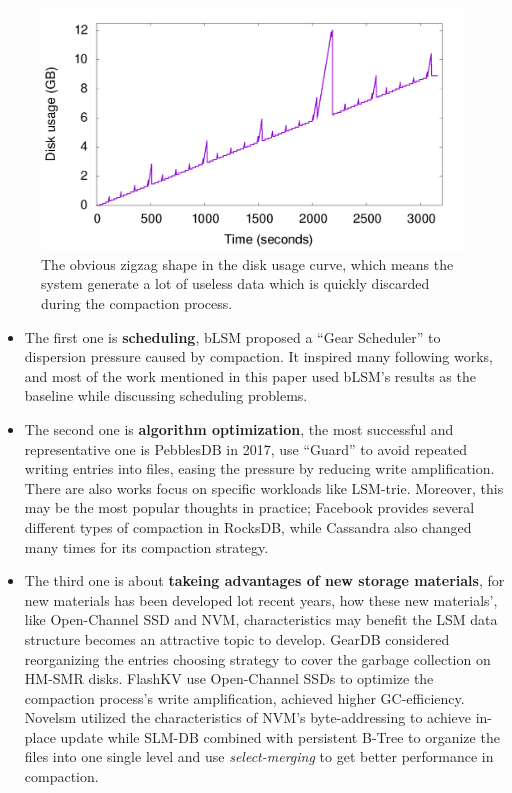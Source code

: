 \begin{figure}
	\centering
	\includegraphics[width=0.9\columnwidth]{fig/compaction-2}
	\caption{The obvious zigzag shape in the disk usage curve, which means the system generate a lot of useless data which is quickly discarded during the compaction process.}
	\label{fig:disk_usage}
\end{figure}

\begin{itemize}
	\item The first one is \textbf{scheduling},  bLSM\cite{sears2012blsm} proposed a ``Gear Scheduler'' to dispersion pressure caused by compaction. It inspired many following works, and most of the work mentioned in this paper used bLSM's results as the baseline while discussing scheduling problems. 
	\item     The second one is \textbf{algorithm optimization}, the most successful and representative one is PebblesDB in 2017\cite{raju2017pebblesdb}, use ``Guard'' to avoid repeated writing entries into files, easing the pressure by reducing write amplification. There are also works focus on specific workloads like LSM-trie\cite{wu2015lsm}. Moreover, this may be the most popular thoughts in practice; Facebook provides several different types of compaction in RocksDB\cite{Compacti60:online},\cite{dong2017optimizing} while Cassandra also changed many times for its compaction strategy\cite{Document20:online}.  
	\item The third one is about \textbf{takeing advantages of new storage materials}, for new materials has been developed lot recent years, how these new materials', like Open-Channel SSD\cite{bjorling2017lightnvm} and NVM, characteristics may benefit the LSM data structure becomes an attractive topic to develop. GearDB\cite{yao2019geardb} considered reorganizing the entries choosing strategy to cover the garbage collection on HM-SMR disks. FlashKV\cite{zhang2017flashkv} use Open-Channel SSDs to optimize the compaction process's write amplification, achieved higher GC-efficiency. Novelsm\cite{kannan2018redesigning} utilized the characteristics of NVM's byte-addressing to achieve in-place update while SLM-DB\cite{kaiyrakhmet2019slm} combined with persistent B-Tree to organize the files into one single level and use \textit{select-merging} to get better performance in compaction.
\end{itemize}


